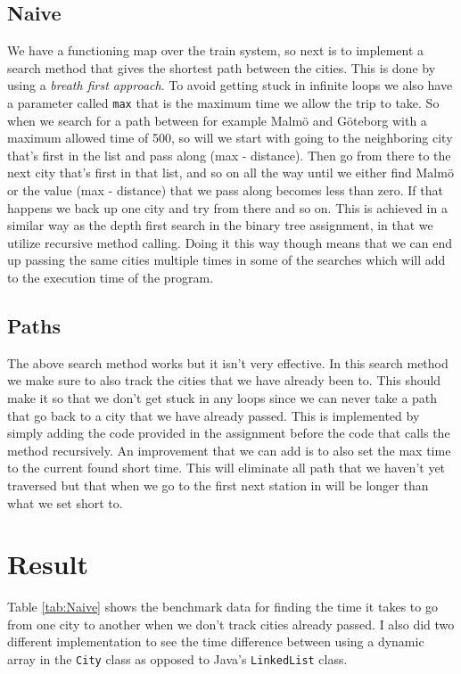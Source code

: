 \documentclass[a4paper,11pt]{article}
\begin{document}
\subsection{Naive}
We have a functioning map over the train system, so next is to implement a search method that gives the shortest path between the cities.
This is done by using a \textit{breath first approach}. To avoid getting stuck in infinite loops we also have a parameter called {\tt max}
that is the maximum time we allow the trip to take. So when we search for a path between for example Malmö and Göteborg with a maximum allowed
time of 500, so will we start with going to the neighboring city that's first in the list and pass along (max - distance). Then go from
there to the next city that's first in that list, and so on all the way until we either find Malmö or the value (max - distance) that we
pass along becomes less than zero. If that happens we back up one city and try from there and so on. This is achieved in a similar way as
the depth first search in the binary tree assignment, in that we utilize recursive method calling. Doing it this way though means that we
can end up passing the same cities multiple times in some of the searches which will add to the execution time of the program.

\subsection{Paths}
\label{sub:paths}
The above search method works but it isn't very effective. In this search method we make sure to also track the cities that we have already
been to. This should make it so that we don't get stuck in any loops since we can never take a path that go back to a city that we have
already passed. This is implemented by simply adding the code provided in the assignment before the code that calls the method recursively.
An improvement that we can add is to also set the max time to the current found short time. This will eliminate all path that we haven't
yet traversed but that when we go to the first next station in will be longer than what we set short to.

\section{Result}
Table \ref{tab:Naive} shows the benchmark data for finding the time it takes to go from one city to another when we don't track cities already
passed. I also did two different implementation to see the time difference between using a dynamic array in the {\tt City} class as opposed to Java's
{\tt LinkedList} class.
\end{document}
